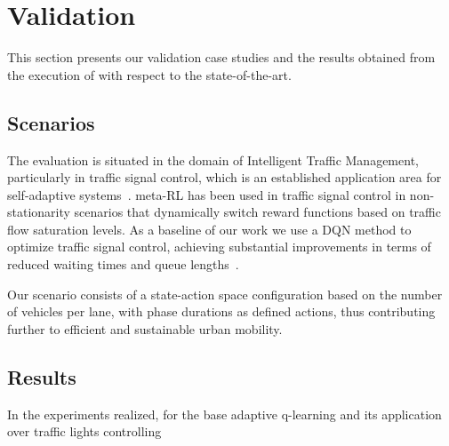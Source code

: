 
\section{Validation}
\label{sec:validation}

This section presents our validation case studies and the results obtained from the execution of \adaptiverl with respect to the state-of-the-art. 
\subsection{Scenarios}

The evaluation is situated in the domain of Intelligent Traffic Management, particularly in traffic signal 
control, which is an established application area for self-adaptive 
systems~\cite{HENRICHS2022106940}. meta-\ac{RL} has been used in traffic signal control in 
non-stationarity scenarios that dynamically switch reward functions based on traffic flow saturation 
levels. As a baseline of our work we use a \acf{DQN} method to optimize traffic signal control, achieving 
substantial improvements in terms of reduced waiting times and queue 
lengths~\cite{Swapno2024,MORENOMALO2024124178}.

Our scenario consists of a state-action space configuration based on the number of vehicles per lane, with phase durations as defined actions, thus contributing further to efficient and sustainable urban mobility.


\subsection{Results}

In the experiments realized, for the base adaptive q-learning and its application over traffic lights controlling 



\endinput

